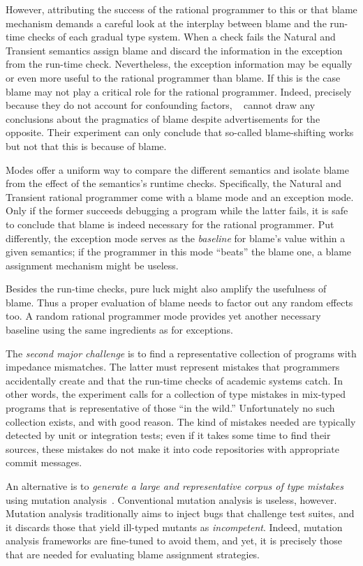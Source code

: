 However, attributing the success of the rational programmer to this or
that blame mechanism demands a careful look at the interplay between blame
and the run-time checks of each gradual type system. When a check fails
the Natural and Transient semantics assign blame and discard  the
information in the exception from the run-time check. Nevertheless, the
exception information may be equally or even more useful to the rational
programmer than blame. If this is the case blame may not play a critical
role for the rational programmer. Indeed, precisely because they do not
account for confounding factors, ~\citet{lksfd-popl-2020} cannot draw any
conclusions about the pragmatics of blame despite advertisements for the
opposite. Their experiment can only conclude that so-called blame-shifting
works but not that this is because of blame. 

Modes offer a uniform way to compare the different semantics and  isolate
blame from the effect of the semantics's runtime checks. Specifically, the Natural and
Transient rational programmer come with a blame mode and an exception
mode. Only if the former succeeds debugging a program while the latter
fails, it is safe to conclude that blame is indeed necessary for the
rational programmer. Put differently, the exception mode serves as the
{\em baseline\/} for blame's value within a given semantics; if the
programmer in this mode ``beats'' the  blame one, a blame assignment
mechanism might be useless.

Besides the run-time checks, pure luck might also amplify the usefulness
of blame. Thus a proper evaluation of blame needs to factor out any random
effects too. A random rational programmer mode provides yet another necessary
baseline using the same ingredients as for exceptions. 

The {\em second major challenge\/} is to find a representative collection of
programs with impedance mismatches. The latter must represent mistakes that programmers
accidentally create and that the run-time checks of academic systems catch. In
other words, the experiment calls for a collection of type mistakes in
mix-typed programs that is representative of those ``in the wild.''
Unfortunately no such collection exists, and with good reason. The kind of
mistakes needed are typically detected by unit or integration tests; even if it
takes some time to find their sources, these mistakes do not make it into code
repositories with appropriate commit messages.

An alternative is to {\em generate a large and representative corpus of type
mistakes \/} using mutation analysis~\cite{lipton1971fault, demillo1978hints,
jia2011analysis}. Conventional mutation analysis is useless, however.  Mutation
analysis traditionally aims to inject bugs that challenge test suites, and it
discards those that yield ill-typed mutants as \emph{incompetent}. Indeed,
mutation analysis frameworks are fine-tuned to avoid them, and yet, it is
precisely those that are needed for evaluating blame assignment strategies.

